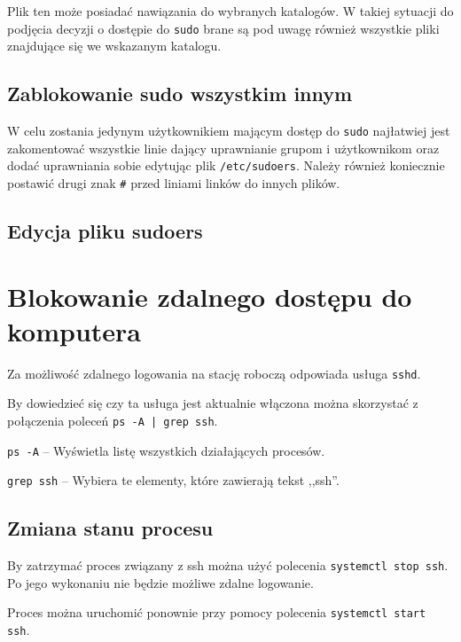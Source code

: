 \documentclass{article}
\begin{document}
Plik ten może posiadać nawiązania do wybranych katalogów. W takiej sytuacji do podjęcia decyzji o dostępie do \texttt{sudo} brane są pod uwagę również wszystkie pliki znajdujące się we wskazanym katalogu.

\subsection{Zablokowanie sudo wszystkim innym}
W celu zostania jedynym użytkownikiem mającym dostęp do \texttt{sudo} najłatwiej jest zakomentować wszystkie linie dający uprawnianie grupom i użytkownikom oraz dodać uprawniania sobie edytując plik \texttt{/etc/sudoers}. Należy również koniecznie postawić drugi znak \texttt{\#} przed liniami linków do innych plików.

\subsection{Edycja pliku sudoers}


\section{Blokowanie zdalnego dostępu do komputera}
Za możliwość zdalnego logowania na stację roboczą odpowiada usługa \texttt{sshd}.

By dowiedzieć się czy ta usługa jest aktualnie włączona można skorzystać z połączenia poleceń \texttt{ps -A | grep ssh}. \par{}
\texttt{ps -A} -- Wyświetla listę wszystkich działających procesów. \par{}
\texttt{grep ssh} -- Wybiera te elementy, które zawierają tekst ,,ssh''.

\subsection{Zmiana stanu procesu}
By zatrzymać proces związany z ssh można użyć polecenia \texttt{systemctl stop ssh}. Po jego wykonaniu nie będzie możliwe zdalne logowanie.

Proces można uruchomić ponownie przy pomocy polecenia \texttt{systemctl start ssh}.
\end{document}
